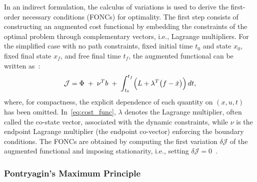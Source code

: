 In an indirect formulation, the calculus of variations is used to derive the first-order necessary conditions (FONCs) for optimality. The first step consists of constructing an augmented cost functional by embedding the constraints of the optimal problem through complementary vectors, i.e., Lagrange multipliers. For the simplified case with no path constraints, fixed initial time $t_0$ and state $x_0$, fixed final state $x_f$, and free final time $t_f$, the augmented functional can be written as~\cite{BettsSurvey1998}:
\begin{equation}
\label{eq:cost_func}
\mathcal{J}
=
\Phi \;+\; \nu^{T} b \;+\; \int_{t_0}^{t_f} \Bigl( L + \lambda^{T}\bigl(f-\dot{x}\bigr) \Bigr)\,dt ,
\end{equation}
where, for compactness, the explicit dependence of each quantity on $(x,u,t)$ has been omitted. In~\ref{eq:cost_func}, $\lambda$ denotes the Lagrange multiplier, often called the co-state vector, associated with the dynamic constraints, while $\nu$ is the endpoint Lagrange multiplier (the endpoint co-vector) enforcing the boundary conditions. The FONCs are obtained by computing the first variation $\delta \mathcal{J}$ of the augmented functional and imposing stationarity, i.e., setting $\delta \mathcal{J}=0$~\cite{Liberzon2012CalculusVariationsOptimalControl}.


\subsubsection{Pontryagin's Maximum Principle}

